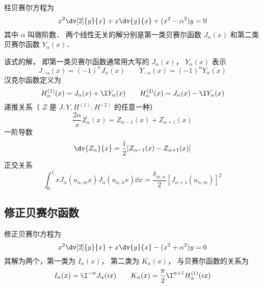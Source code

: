 
柱贝赛尔方程为%
\begin{equation}
x^2 \dv[2]{y}{x} + x\dv{y}{x} + (x^2 - \alpha ^2)y = 0
\end{equation}
其中 $\alpha$ 叫做阶数． 两个线性无关的解分别是第一类贝赛尔函数 $J_\alpha(x)$ 和第二类贝赛尔函数 $Y_\alpha(x)$． 

该式的解， 即第一类贝赛尔函数通常用大写的 $J_\alpha(x)$， $Y_\alpha(x)$ 表示
\begin{equation}
J_{-\alpha}(x) = (-1)^\alpha J_\alpha(x)
\qquad
Y_{-\alpha}(x) = (-1)^\alpha Y_\alpha(x)
\end{equation}
汉克尔函数定义为
\begin{equation}
H_\alpha ^{(1)}(x) = J_\alpha(x) + \I Y_\alpha(x)
\qquad
H_\alpha ^{(2)}(x) = J_\alpha(x) - \I Y_\alpha(x)
\end{equation} 
递推关系（ $Z$ 是 $J, Y, H^{(1)}, H^{(2)}$ 的任意一种）
\begin{equation}
\frac{2\alpha}{x} Z_\alpha(x) = Z_{\alpha -1}(x) + Z_{\alpha+1}(x)
\end{equation}
一阶导数
\begin{equation}
\dv{Z_\alpha}{x} = \frac12 [Z_{\alpha  - 1}(x) - Z_{\alpha +1}(x)]
\end{equation}
正交关系
\begin{equation}
\int_0^1 x J_\alpha (u_{\alpha ,m} x) J_\alpha (u_{\alpha ,n} x) \dd{x} = \frac{\delta_{m,n}}{2}[J_{\alpha + 1} (u_{\alpha ,m})]^2
\end{equation}

\subsection{修正贝赛尔函数}
修正贝赛尔方程为
\begin{equation}
x^2 \dv[2]{y}{x} + x \dv{y}{x} - (x^2 + \alpha ^2)y = 0
\end{equation}
其解为两个，第一类为 $I_\alpha(x)$，  第二类为 $K_\alpha(x)$，  与贝赛尔函数的关系为
\begin{equation}
I_\alpha(x) = \I^{-\alpha} J_\alpha(ix)
\qquad
K_\alpha(x) = \frac{\pi}{2} \I^{\alpha  + 1} H_\alpha ^{(1)}(ix)
\end{equation}

